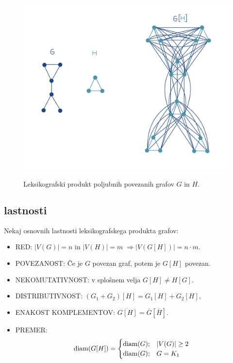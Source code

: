 \documentclass[mat1, tisk]{fmfdelo}
\begin{document}
\begin{figure}[h]
    \caption{Leksikografski produkt poljubnih povezanih grafov $G$ in $H$.}
    \centering
    \includegraphics[width=\textwidth]{IMG_produkt.jpg}   
    \label{fig:produkt}   
\end{figure}




\subsection{lastnosti} \label{ss:lastnosti_leks_prod}
Nekaj osnovnih lastnosti leksikografskega produkta grafov:
\begin{itemize}
    \item RED: $|V(G)| = n$ in $|V(H)| = m \; \Rightarrow |V(G[H])| = n \cdot m.$
    \item POVEZANOST: Če je $G$ povezan graf, potem je $G[H]$ povezan. 
    \item NEKOMUTATIVNOST: v splošnem velja $G[H] \neq H[G].$
    \item DISTRIBUTIVNOST: $(G_1 + G_2)[H] = G_1[H] + G_2[H],$ 
    \item ENAKOST KOMPLEMENTOV: $\overline{G[H]} = \overline{G} [\overline{H}].$
    \item PREMER: $$ {\rm diam}(G[H]) =  \begin{cases} 
        {\rm diam}(G); & |V(G)| \geq 2 \\
        {\rm diam}(G); & G = K_1
        \end{cases}$$

\end{itemize}
\end{document}
